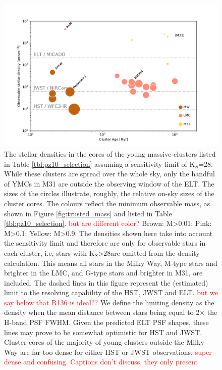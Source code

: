 \begin{figure}

    \centering
    \includegraphics[width=\textwidth]{images/star_density_vs_age.pdf}


    \caption{
    The stellar densities in the cores of the young massive clusters listed in Table \ref{tbl:pz10_selection} assuming a sensitivity limit of K$_S$=28\m. While these clusters are spread over the whole sky, only the handful of YMCs in M31 are outside the observing window of the ELT. The sizes of the circles illustrate, roughly, the relative on-sky sizes of the cluster cores. The colours reflect the minimum observable mass, as shown in Figure \ref{fig:trusted_mass} and listed in Table \ref{tbl:pz10_selection}. \textcolor{red}{but are different color?}
    Brown: M\textgreater0.01\msun; Pink: M\textgreater0.1\msun; Yellow: M\textgreater0.9\msun. 
    The densities shown here take into account the sensitivity limit and therefore are only for observable stars in each cluster, i.e, stars with K$_S$\textgreater28\m are omitted from the density calculation.  This means all stars in the Milky Way, M-type stars and brighter in the LMC, and G-type stars and brighter in M31, are included. 
    The dashed lines in this figure represent the (estimated) limit to the resolving capability of the HST, JWST and ELT. \textcolor{red}{but we say below that R136 is ideal??}
    We define the limiting density as the density when the mean distance between stars being equal to 2$\times$ the H-band PSF FWHM.
    Given the predicted ELT PSF shapes, these lines may prove to be somewhat optimistic for HST and JWST.  Cluster cores of the majority of young clusters outside the Milky Way are far too dense for either HST or JWST observations.   \textcolor{red}{super dense and confusing. Captions don't discuss, they only present}}
    
    \label{fig:star_density_vs_age}
    
\end{figure}


